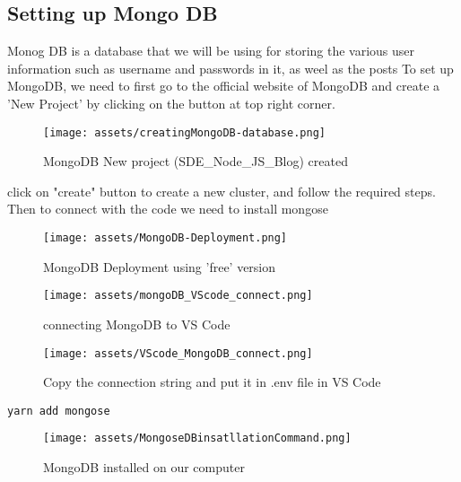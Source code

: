 \documentclass[12pt]{article}
\begin{document}
\subsection{Setting up Mongo DB}

Monog DB is a database that we will be using for storing the various user information such as username and passwords in it, as weel as the posts
To set up MongoDB, we need to first go to the official website of MongoDB and create a 'New Project' by clicking on the button at top right corner.


\begin{figure}[H]
    \centering
    \texttt{[image: assets/creatingMongoDB-database.png]}
    \caption{MongoDB New project (SDE\_Node\_JS\_Blog) created}
    \label{fig:logo}
\end{figure}

click on "create" button to create a new cluster, and follow the required steps. Then to connect with the code we need to install mongose

\begin{figure}[H]
    \centering
    \texttt{[image: assets/MongoDB-Deployment.png]}
    \caption{MongoDB Deployment using 'free' version}
    \label{fig:logo}
\end{figure}

\begin{figure}[H]
    \centering
    \texttt{[image: assets/mongoDB\_VScode\_connect.png]}
    \caption{connecting MongoDB to VS Code}
    \label{fig:logo}
\end{figure}

\clearpage

\begin{figure}[H]
    \centering
    \texttt{[image: assets/VScode\_MongoDB\_connect.png]}
    \caption{Copy the connection string and put it in .env file in VS Code}
    \label{fig:logo}
\end{figure}


\begin{listing}[htbp]
\begin{verbatim}
yarn add mongose
\end{verbatim}
\end{listing}


\begin{figure}[H]
    \centering
    \texttt{[image: assets/MongoseDBinsatllationCommand.png]}
    \caption{MongoDB installed on our computer}
    \label{fig:logo}
\end{figure}
\end{document}
